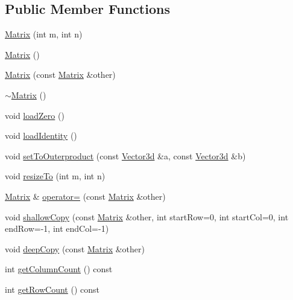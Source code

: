 \subsection*{Public Member Functions}
\begin{DoxyCompactItemize}
\item 
\hyperlink{classCartWheel_1_1Math_1_1Matrix_a75e25f70a760fa9625afa33a3c44af8f}{Matrix} (int m, int n)
\item 
\hyperlink{classCartWheel_1_1Math_1_1Matrix_a2dba13c45127354c9f75ef576f49269b}{Matrix} ()
\item 
\hyperlink{classCartWheel_1_1Math_1_1Matrix_abcf708e864ed3d9db2c3b317c5e529ab}{Matrix} (const \hyperlink{classCartWheel_1_1Math_1_1Matrix}{Matrix} \&other)
\item 
\hyperlink{classCartWheel_1_1Math_1_1Matrix_a9b1c3627f573d78a2f08623fdfef990f}{$\sim$Matrix} ()
\item 
void \hyperlink{classCartWheel_1_1Math_1_1Matrix_a197165ec6577b17ee5ca89af07007d64}{loadZero} ()
\item 
void \hyperlink{classCartWheel_1_1Math_1_1Matrix_a980ae445a0df5fab5b4e68ce83221853}{loadIdentity} ()
\item 
void \hyperlink{classCartWheel_1_1Math_1_1Matrix_a3168ef0ced8aa0c414f45049d6db5637}{setToOuterproduct} (const \hyperlink{classCartWheel_1_1Math_1_1Vector3d}{Vector3d} \&a, const \hyperlink{classCartWheel_1_1Math_1_1Vector3d}{Vector3d} \&b)
\item 
void \hyperlink{classCartWheel_1_1Math_1_1Matrix_aa281a0802c0826225f68d2f5859a5b18}{resizeTo} (int m, int n)
\item 
\hyperlink{classCartWheel_1_1Math_1_1Matrix}{Matrix} \& \hyperlink{classCartWheel_1_1Math_1_1Matrix_a3e40db12ae78b7616ee3f099bb15f13d}{operator=} (const \hyperlink{classCartWheel_1_1Math_1_1Matrix}{Matrix} \&other)
\item 
void \hyperlink{classCartWheel_1_1Math_1_1Matrix_a06aa42f9aa88cbc2e1557e5d4cbc24ec}{shallowCopy} (const \hyperlink{classCartWheel_1_1Math_1_1Matrix}{Matrix} \&other, int startRow=0, int startCol=0, int endRow=-\/1, int endCol=-\/1)
\item 
void \hyperlink{classCartWheel_1_1Math_1_1Matrix_ae2507575dc309db73a9728f7434b3ac3}{deepCopy} (const \hyperlink{classCartWheel_1_1Math_1_1Matrix}{Matrix} \&other)
\item 
int \hyperlink{classCartWheel_1_1Math_1_1Matrix_af20ba138dda21ea5c3b4fc94cfaebdca}{getColumnCount} () const 
\item 
int \hyperlink{classCartWheel_1_1Math_1_1Matrix_a5c379dc39ded5ac48a498f6f6ad0dfc6}{getRowCount} () const 

\end{DoxyCompactItemize}
